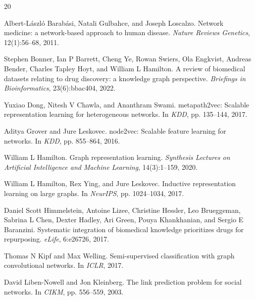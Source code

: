 \documentclass{article}
\begin{document}



\begin{thebibliography}{20}

Albert-L\'aszl\'o Barab\'asi, Natali Gulbahce, and Joseph Loscalzo.
\newblock Network medicine: a network-based approach to human disease.
\newblock \emph{Nature Reviews Genetics}, 12(1):56--68, 2011.

Stephen Bonner, Ian P Barrett, Cheng Ye, Rowan Swiers, Ola Engkvist, Andreas Bender, Charles Tapley Hoyt, and William L Hamilton.
\newblock A review of biomedical datasets relating to drug discovery: a knowledge graph perspective.
\newblock \emph{Briefings in Bioinformatics}, 23(6):bbac404, 2022.

Yuxiao Dong, Nitesh V Chawla, and Ananthram Swami.
\newblock metapath2vec: Scalable representation learning for heterogeneous networks.
\newblock In \emph{KDD}, pp. 135--144, 2017.

Aditya Grover and Jure Leskovec.
\newblock node2vec: Scalable feature learning for networks.
\newblock In \emph{KDD}, pp. 855--864, 2016.

William L Hamilton.
\newblock Graph representation learning.
\newblock \emph{Synthesis Lectures on Artificial Intelligence and Machine Learning}, 14(3):1--159, 2020.

William L Hamilton, Rex Ying, and Jure Leskovec.
\newblock Inductive representation learning on large graphs.
\newblock In \emph{NeurIPS}, pp. 1024--1034, 2017.

Daniel Scott Himmelstein, Antoine Lizee, Christine Hessler, Leo Brueggeman, Sabrina L Chen, Dexter Hadley, Ari Green, Pouya Khankhanian, and Sergio E Baranzini.
\newblock Systematic integration of biomedical knowledge prioritizes drugs for repurposing.
\newblock \emph{eLife}, 6:e26726, 2017.

Thomas N Kipf and Max Welling.
\newblock Semi-supervised classification with graph convolutional networks.
\newblock In \emph{ICLR}, 2017.

David Liben-Nowell and Jon Kleinberg.
\newblock The link prediction problem for social networks.
\newblock In \emph{CIKM}, pp. 556--559, 2003.


\end{thebibliography}
\end{document}
